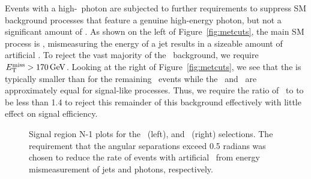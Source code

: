 Events with a high-\pt\ photon are subjected to further requirements to suppress SM background processes that feature a genuine high-energy photon, but not a significant amount of \met.
As shown on the left of Figure~\ref{fig:metcuts}, the main SM process is \gj, mismeasuring the energy of a jet results in a sizeable amount of artificial \met.
To reject the vast majority of the \gj\ background, we require $E_{\mathrm{T}}^{\text{miss}} > 170\,\text{Ge\hspace{-.08em}V}$.
Looking at the right of Figure~\ref{fig:metcuts}, we see that the \met is typically smaller than \ETg for the remaining \gj\ events while the \met\ and \ETg\ are approximately equal for signal-like processes.
Thus, we require the ratio of \ETg\ to \met to be less than 1.4 to reject this remainder of this background effectively with little effect on signal efficiency.

\begin{figure}[htbp]
  \centering
  \caption{
    Signal region N-1 plots for the \mindphijmet\ (left), and \dphigmet\ (right) selections.
    The requirement that the angular separations exceed 0.5 radians was chosen to reduce the rate of events with artificial \met\ from energy mismeasurement of jets and photons, respectively.
  }
  \label{fig:n-1}
\end{figure}

